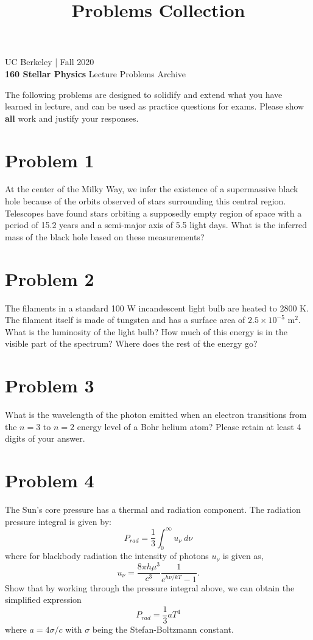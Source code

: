 \documentclass[12pt]{article}
\title{Problems Collection}
\begin{document}
UC Berkeley | Fall 2020 \\
\textbf{160 Stellar Physics} Lecture \hfill Problems Archive
\vspace{-0.5cm}

\hrulefill

The following problems are designed to solidify and extend what you have learned in lecture, and can be used as practice questions for exams. Please show \textbf{all} work and justify your responses.

\section*{Problem 1}
At the center of the Milky Way, we infer the existence of a supermassive black hole because of the orbits observed of stars surrounding this central region. Telescopes have found stars orbiting a supposedly empty region of space with a period of 15.2 years and a semi-major axis of 5.5 light days. What is the inferred mass of the black hole based on these measurements?



\section*{Problem 2}
The filaments in a standard 100 W incandescent light bulb are heated to 2800 K. The filament itself is made of tungsten and has a surface area of $2.5 \times 10^{-5}$ m$^2$. What is the luminosity of the light bulb? How much of this energy is in the visible part of the spectrum? Where does the rest of the energy go?


\section*{Problem 3}
What is the wavelength of the photon emitted when an electron transitions from the $n = 3$ to $n = 2$ energy level of a Bohr helium atom? Please retain at least 4 digits of your answer.


\section*{Problem 4}
The Sun's core pressure has a thermal and radiation component. The radiation pressure integral is given by:
\begin{equation*}
P_{rad} = \frac{1}{3} \int_{0}^{\infty} u_{\nu} ~d\nu
\end{equation*}
where for blackbody radiation the intensity of photons $u_{\nu}$ is given as,
\begin{equation*}
u_{\nu} = \frac{8\pi h\mu^3}{c^3}\frac{1}{e^{h\nu /kT}-1}.
\end{equation*}
Show that by working through the pressure integral above, we can obtain the simplified expression 
\begin{equation*}
P_{rad} = \frac{1}{3}aT^4
\end{equation*}
where $a = 4\sigma/c$ with $\sigma$ being the Stefan-Boltzmann constant.
\end{document}
